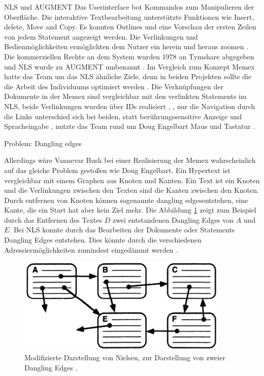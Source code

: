 \begin{section}{NLS und AUGMENT}
Das Userinterface bot Kommandos zum Manipulieren der Oberfläche. Die interaktive Textbearbeitung unterstützte Funktionen wie Insert, delete, Move and Copy. Es konnten Outlines und eine Vorschau der ersten Zeilen von jedem Statement angezeigt werden. Die Verlinkungen und Bedienmöglichkeiten ermöglichten dem Nutzer ein \glqq herein und heraus zoomen \grqq{ }\cite{MotherOfDemo1968}. Die kommerziellen Rechte an dem System wurden 1978 an Tymshare abgegeben und NLS wurde zu AUGMENT umbenannt \cite{Engelbart1984}. Im Vergleich zum Konzept Memex hatte das Team um das NLS ähnliche Ziele, denn in beiden Projekten sollte die die Arbeit des Individuums optimiert werden \cite{Life1945} \cite{MotherOfDemo1968}. Die Verknüpfungen der Dokumente in der Memex sind vergleichbar mit den verlinkten Statements im NLS, beide Verlinkungen wurden über IDs realisiert \cite{Engelbart1984}, \cite{Bush1945}, nur die Navigation durch die Links unterschied sich bei beiden, statt berührungssensitive Anzeige und Spracheingabe \cite{Bush1945}, nutzte das Team rund um Doug Engelbart Maus und Tastatur \cite{MotherOfDemo1968}.

\end{section}

\begin{section}{Problem: Dangling edges}
\label{sec:dangling}

Allerdings wäre Vannevar Bush bei einer Realisierung der Memex wahrscheinlich auf das gleiche Problem gestoßen wie Doug Engelbart. Ein Hypertext ist vergleichbar mit einem Graphen aus Knoten und Kanten. Ein Text ist ein Knoten und die Verlinkungen zwischen den Texten sind die Kanten zwischen den Knoten. Durch entfernen von Knoten können sogenannte \glqq dangling edges\grqq{ }entstehen, eine Kante, die ein Start hat aber kein Ziel mehr. Die Abbildung \ref{fig:dangle} zeigt zum Beispiel durch das Entfernen des Textes $D$ zwei entstandenen Dangling Edges von $A$ und $E$. Bei NLS konnte durch das Bearbeiten der Dokumente oder Statements Dangling Edges entstehen. Dies könnte durch die verschiedenen Adressiermöglichkeiten zumindest eingedämmt werden \cite{Engelbart1984}.

\begin{figure}[H]
	\centering
	\includegraphics[width=0.9\textwidth]{image/dangle}
	\caption{Modifizierte Darstellung von Nielsen, zur Darstellung von zweier Dangling Edges \cite[S.1]{Nielsen1995}.}
	\label{fig:dangle}
\end{figure}

\end{section}

